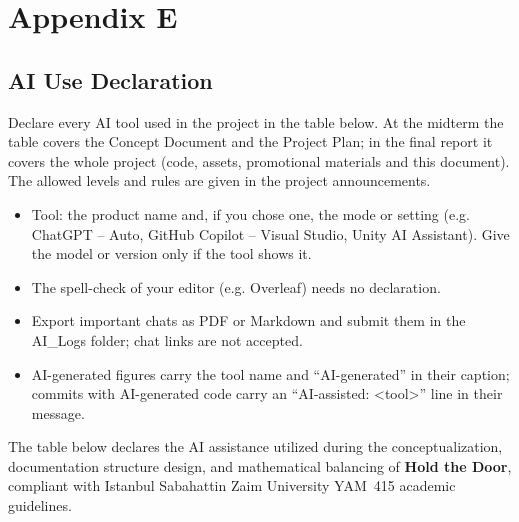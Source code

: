 \section{Appendix E}

\subsection{AI Use Declaration}

\begin{guidance}
Declare every AI tool used in the project in the table below. At the midterm the table covers the Concept Document and the Project Plan; in the final report it covers the whole project (code, assets, promotional materials and this document). The allowed levels and rules are given in the project announcements.

\begin{itemize}[label=\textbullet]
  \item Tool: the product name and, if you chose one, the mode or setting (e.g. ChatGPT – Auto, GitHub Copilot – Visual Studio, Unity AI Assistant). Give the model or version only if the tool shows it.
  \item The spell-check of your editor (e.g. Overleaf) needs no declaration.
  \item Export important chats as PDF or Markdown and submit them in the AI\_Logs folder; chat links are not accepted.
  \item AI-generated figures carry the tool name and “AI-generated” in their caption; commits with AI-generated code carry an “AI-assisted: \textless{}tool\textgreater{}” line in their message.
\end{itemize}
\end{guidance}

The table below declares the AI assistance utilized during the conceptualization, documentation structure design, and mathematical balancing of \textbf{Hold the Door}, compliant with Istanbul Sabahattin Zaim University YAM~415 academic guidelines.


